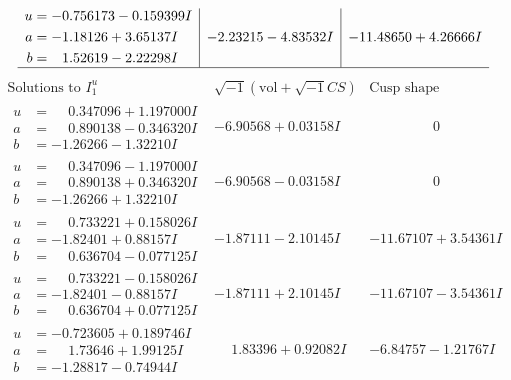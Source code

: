 \documentclass[1p]{elsarticle_modified}
\theoremstyle{definition}
\newcommand{\I}{\sqrt{-1}}
\begin{document}
$$\begin{array}{c|c|c}
\begin{aligned}
u &= -0.756173 - 0.159399 I \\
a &= -1.18126 + 3.65137 I \\
b &= \phantom{-}1.52619 - 2.22298 I\end{aligned}
 & -2.23215 - 4.83532 I & -11.48650 + 4.26666 I\\
 \hline 
 \end{array}$$\newpage$$\begin{array}{c|c|c}  
\text{Solutions to }I^u_{1}& \I (\text{vol} + \sqrt{-1}CS) & \text{Cusp shape}\\
 \hline 
\begin{aligned}
u &= \phantom{-}0.347096 + 1.197000 I \\
a &= \phantom{-}0.890138 - 0.346320 I \\
b &= -1.26266 - 1.32210 I\end{aligned}
 & -6.90568 + 0.03158 I & \phantom{-0.000000 } 0 \\ \hline\begin{aligned}
u &= \phantom{-}0.347096 - 1.197000 I \\
a &= \phantom{-}0.890138 + 0.346320 I \\
b &= -1.26266 + 1.32210 I\end{aligned}
 & -6.90568 - 0.03158 I & \phantom{-0.000000 } 0 \\ \hline\begin{aligned}
u &= \phantom{-}0.733221 + 0.158026 I \\
a &= -1.82401 + 0.88157 I \\
b &= \phantom{-}0.636704 - 0.077125 I\end{aligned}
 & -1.87111 - 2.10145 I & -11.67107 + 3.54361 I \\ \hline\begin{aligned}
u &= \phantom{-}0.733221 - 0.158026 I \\
a &= -1.82401 - 0.88157 I \\
b &= \phantom{-}0.636704 + 0.077125 I\end{aligned}
 & -1.87111 + 2.10145 I & -11.67107 - 3.54361 I \\ \hline\begin{aligned}
u &= -0.723605 + 0.189746 I \\
a &= \phantom{-}1.73646 + 1.99125 I \\
b &= -1.28817 - 0.74944 I\end{aligned}
 & \phantom{-}1.83396 + 0.92082 I & -6.84757 - 1.21767 I \\ \hline\begin{aligned}

\end{aligned}
\end{array}$$
\end{document}
